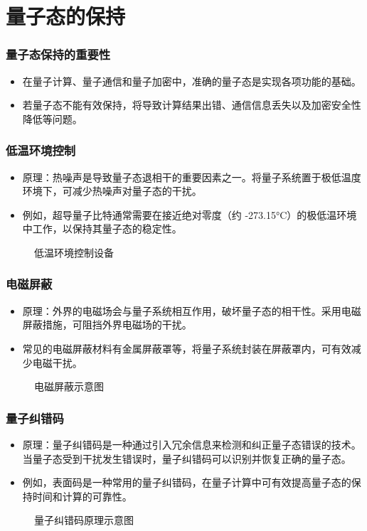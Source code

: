 \section{量子态的保持}
\begin{frame}
    \frametitle{量子态保持的重要性}
    \begin{itemize}
        \item 在量子计算、量子通信和量子加密中，准确的量子态是实现各项功能的基础。
        \item 若量子态不能有效保持，将导致计算结果出错、通信信息丢失以及加密安全性降低等问题。
    \end{itemize}
\end{frame}

\begin{frame}
    \frametitle{低温环境控制}
    \begin{itemize}
        \item 原理：热噪声是导致量子态退相干的重要因素之一。将量子系统置于极低温度环境下，可减少热噪声对量子态的干扰。
        \item 例如，超导量子比特通常需要在接近绝对零度（约 -273.15°C）的极低温环境中工作，以保持其量子态的稳定性。
    \end{itemize}
    \begin{figure}
        \centering
        \caption{低温环境控制设备}
    \end{figure}
\end{frame}

\begin{frame}
    \frametitle{电磁屏蔽}
    \begin{itemize}
        \item 原理：外界的电磁场会与量子系统相互作用，破坏量子态的相干性。采用电磁屏蔽措施，可阻挡外界电磁场的干扰。
        \item 常见的电磁屏蔽材料有金属屏蔽罩等，将量子系统封装在屏蔽罩内，可有效减少电磁干扰。
    \end{itemize}
    \begin{figure}
        \centering
        \caption{电磁屏蔽示意图}
    \end{figure}
\end{frame}

\begin{frame}
    \frametitle{量子纠错码}
    \begin{itemize}
        \item 原理：量子纠错码是一种通过引入冗余信息来检测和纠正量子态错误的技术。当量子态受到干扰发生错误时，量子纠错码可以识别并恢复正确的量子态。
        \item 例如，表面码是一种常用的量子纠错码，在量子计算中可有效提高量子态的保持时间和计算的可靠性。
    \end{itemize}
    \begin{figure}
        \centering
        \caption{量子纠错码原理示意图}
    \end{figure}
\end{frame}

